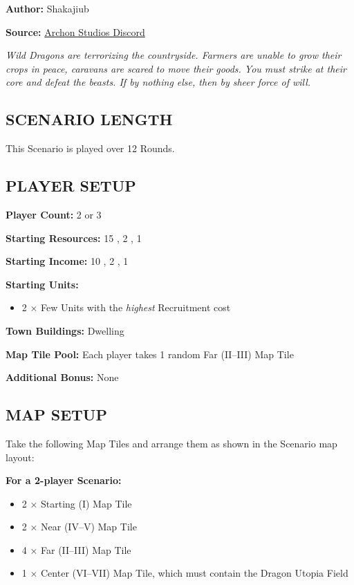 
\begin{multicols*}{2}

\textbf{Author:} Shakajiub

\textbf{Source:} \href{https://discord.com/channels/740870068178649108/1237891632448278618}{Archon Studios Discord}

\textit{Wild Dragons are terrorizing the countryside.
Farmers are unable to grow their crops in peace, caravans are scared to move their goods.
You must strike at their core and defeat the beasts.
If by nothing else, then by sheer force of will.}

\subsection*{\MakeUppercase{Scenario Length}}
This Scenario is played over 12 Rounds.

\subsection*{\MakeUppercase{Player Setup}}
\textbf{Player Count:} 2 or 3

\textbf{Starting Resources:} 15 , 2 , 1 

\textbf{Starting Income:} 10 , 2 , 1 

\textbf{Starting Units:}
\begin{itemize}
  \item 2 × Few  Units with the \textit{highest} Recruitment cost
\end{itemize}

\textbf{Town Buildings:}  Dwelling

\textbf{Map Tile Pool:} Each player takes 1 random Far (II--III) Map Tile

\textbf{Additional Bonus:} None

\subsection*{\MakeUppercase{Map Setup}}
Take the following Map Tiles and arrange them as shown in the Scenario map layout:

\textbf{For a 2-player Scenario:}
\begin{itemize}
  \item 2 × Starting (I) Map Tile
  \item 2 × Near (IV--V) Map Tile
  \item 4 × Far (II--III) Map Tile
  \item 1 × Center (VI--VII) Map Tile, which must contain the Dragon Utopia Field
\end{itemize}


\end{multicols*}
